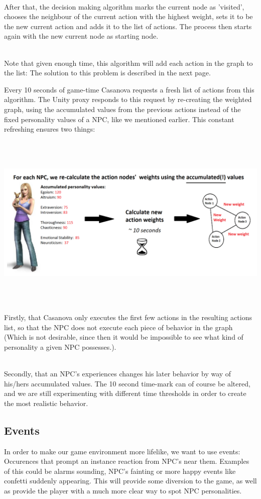 \documentclass[11pt]{article} %
\begin{document}
~\\
After that, the decision making algorithm marks the current node as 'visited', chooses the neighbour of the current action with the highest weight, sets it to be the new current action and adds it to the list of actions. The process then starts again with the new current node as starting node. 

~\\
Note that given enough time, this algorithm will add each action in the graph to the list: The solution to this problem is described in the next page.

\newpage
Every 10 seconds of game-time Casanova requests a fresh list of actions from this algorithm. The Unity proxy responds to this request by re-creating the weighted graph, using the accumulated values from the previous actions instead of the fixed personality values of a NPC, like we mentioned earlier. This constant refreshing ensures two things: 

~\\
\includegraphics[width=17cm, height=7.5cm]{AccumulatedValues}

~\\
Firstly, that Casanova only executes the first few actions in the resulting actions list, so that the NPC does not execute each piece of behavior in the graph (Which is not desirable, since then it would be impossible to see what kind of personality a given NPC possesses.). 

~\\
Secondly, that an NPC's experiences changes his later behavior by way of his/hers accumulated values. 
The 10 second time-mark can of course be altered, and we are still experimenting with different time thresholds in order to create the most realistic behavior.


\newpage
\subsection{Events}
In order to make our game environment more lifelike, we want to use events: Occurences that prompt an instance reaction from NPC's near them. Examples of this could be alarms sounding, NPC's fainting or more happy events like confetti suddenly appearing. This will provide some diversion to the game, as well as provide the player with a much more clear way to spot NPC personalities.
\end{document}

